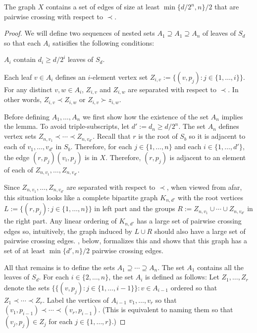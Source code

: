 \documentclass[kpfonts]{patmorin}
\renewcommand{\ge}{\geqslant}
\begin{document}
\begin{lem}
    The graph $X$ contains a set of edges of size at least $\min\{d/2^{n},n\}/2$ that are pairwise crossing with respect to $\prec$.
\end{lem}

\begin{proof}
    We will define two sequences of nested sets $A_1\supseteq A_1\supseteq A_{n}$ of leaves of $S_d$ so that each $A_i$ satisifies the following conditions:
    \begin{compactenum}[(C1)]
        \item $A_i$ contain $d_i\ge d/2^i$ leaves of $S_d$.
        \item Each leaf $v\in A_i$ defines an $i$-element vertex set $Z_{i,v}:=\{(v,p_j):j\in\{1,\ldots,i\}\}$.  For any distinct $v,w\in A_i$, $Z_{i,v}$ and $Z_{i,w}$ are separated with respect to $\prec$.  In other words, $Z_{i,v}\prec Z_{i,w}$ or $Z_{i,v}\succ z_{i,w}$.
    \end{compactenum}

    Before defining $A_1,\ldots,A_n$ we first show how the existence of the set $A_n$ implies the lemma.  To avoid triple-subscripts, let $d':=d_n\ge d/2^n$.   The set $A_n$ defines vertex sets $Z_{n,v_1}\prec\cdots\prec Z_{n,v_{d'}}$.  Recall that $r$ is the root of $S_b$ so it is adjacent to each of $v_{1},\ldots,v_{d'}$ in $S_b$.  Therefore, for each $j\in\{1,\ldots,n\}$ and each $i\in\{1,\ldots,d'\}$, the edge $(r,p_j)(v_i,p_j)$ is in $X$. Therefore, $(r,p_j)$ is adjacent to an element of each of $Z_{n,v_1},\ldots,Z_{n,v_{d'}}$.

    Since $Z_{n,v_1},\ldots,Z_{n,v_{d'}}$ are separated with respect to $\prec$, when viewed from afar, this situation looks like a complete bipartite graph $K_{n,d'}$ with the root vertices $L:=\{(r,p_j):j\in\{1,\ldots,n\}\}$ in left part and the groups $R:=Z_{n,v_1}\cup\cdots\cup Z_{n,v_{d'}}$ in the right part.  Any linear ordering of $K_{n,d'}$ has a large set of pairwise crossing edges so, intuitively, the graph induced by $L\cup R$ should also have a large set of pairwise crossing edges. , below, formalizes this and shows that this graph has a set of at least $\min\{d',n\}/2$ pairwise crossing edges.

    All that remains is to define the sets $A_1\supseteq\cdots\supseteq A_n$.  The set $A_1$ contains all the leaves of $S_d$.  For each $i\in\{2,\ldots,n\}$, the set $A_i$ is defined as follows:  Let $Z_1,\ldots,Z_r$ denote the sets $\{\{(v,p_j):j\in\{1,\ldots,i-1\}\}:v\in A_{i-1}$ ordered so that $Z_1\prec\cdots\prec Z_r$. Label the vertices of $A_{i-1}$ $v_1,\ldots,v_r$ so that $(v_1,p_{i-1})\prec\cdots\prec (v_r,p_{i-1})$. (This is equivalent to naming them so that $(v_j,p_j)\in Z_j$ for each $j\in\{1,\ldots,r\}$.)


\end{proof}
\end{document}
